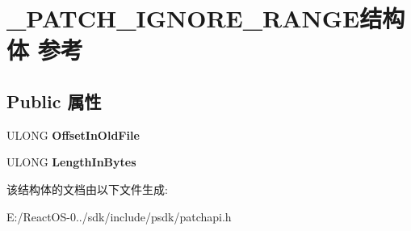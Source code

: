 \hypertarget{struct___p_a_t_c_h___i_g_n_o_r_e___r_a_n_g_e}{}\section{\+\_\+\+P\+A\+T\+C\+H\+\_\+\+I\+G\+N\+O\+R\+E\+\_\+\+R\+A\+N\+G\+E结构体 参考}
\label{struct___p_a_t_c_h___i_g_n_o_r_e___r_a_n_g_e}
\subsection*{Public 属性}
\begin{DoxyCompactItemize}
\item 
\mbox{\label{struct___p_a_t_c_h___i_g_n_o_r_e___r_a_n_g_e_ab45aac5a9b87e132343ea816f68d9e72}} 
U\+L\+O\+NG {\bfseries Offset\+In\+Old\+File}
\item 
\mbox{\label{struct___p_a_t_c_h___i_g_n_o_r_e___r_a_n_g_e_a350d04e2d2ead7ee1587c440e90c65b3}} 
U\+L\+O\+NG {\bfseries Length\+In\+Bytes}
\end{DoxyCompactItemize}


该结构体的文档由以下文件生成\+:\begin{DoxyCompactItemize}
\item 
E\+:/\+React\+O\+S-\/0../sdk/include/psdk/patchapi.\+h\end{DoxyCompactItemize}
